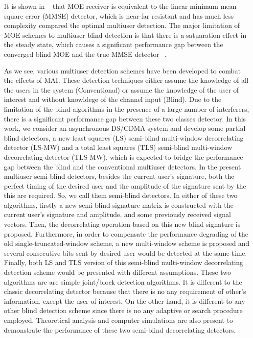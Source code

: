 \documentclass[a4paper,11pt,fleqn]{article}
\begin{document}
It is shown in ~\cite{Honi95} that MOE receiver is equivalent to
the linear minimum mean square error (MMSE) detector, which is
near-far resistant and has much less complexity compared the
optimal multiuser detection. The major limitation of MOE schemes
to multiuser blind detection is that there is a satuaration effect
in the steady state, which causes a significant performance gap
between the converged blind MOE and the true MMSE detector
~\cite{Honi95}.

As we see, various multiuser detection schemes have been developed
to combat the effects of MAI. These detection techniques either
assume the knowledge of all the users in the system (Conventional)
or assume the knowledge of the user of interest and without
knowldege of the channel input (Blind). Due to the limitation of
the blind algorithms in the presence of a large number of
interferers, there is a significant performance gap between these
two classes detector. In this work, we consider an asynchronous
DS/CDMA system and develop some partial blind detectors, a new
least squares (LS) semi-blind multi-window decorrelating detector
(LS-MW) and a total least squares (TLS) semi-blind multi-window
decorrelating detector (TLS-MW), which is expected to bridge the
performance gap between the blind and the conventional multiuser
detectors. In the present multiuser semi-blind detectors, besides
the current user's signature, both the perfect timing of the
desired user and the amplitude of the signature sent by the this
are required. So, we call them semi-blind detectors. In either of
these two algorithms, firstly a new semi-blind signature matrix is
constructed with the current user's signature and amplitude, and
some previously received signal vectors. Then, the decorrelating
operation based on this new blind signature is proposed.
Furthermore, in order to compensate the performance degrading of
the old single-truncated-window scheme, a new multi-window scheme
is proposed and several consecutive bits sent by desired user
would be detected at the same time. Finally, both LS and TLS
version of this semi-blind multi-window decorrelating detection
scheme would be presented with different assumptions. These two
algorithms are are simple joint/block detection algorithms. It is
different to the classic decorrelating detector because that there
is no any requirement of other's information, except the user of
interest. On the other hand,  it is different to any other blind
detection scheme since there is no any adaptive or search
procedure employed. Theoretical analysis and computer simulations
are also present to demonstrate the performance of these two
semi-blind decorrelating detectors.
\end{document}
